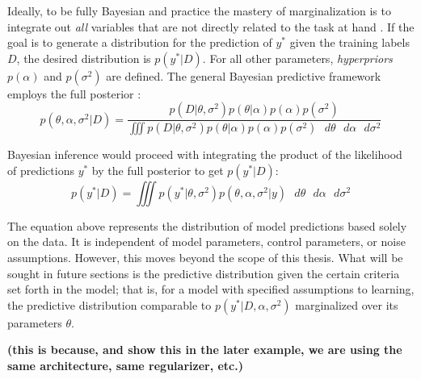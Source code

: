 
Ideally, to be fully Bayesian and practice the mastery of marginalization is to integrate out \textit{all} variables that are not directly related to the task at hand \cite{bishop2006pattern}.  If the goal is to generate a distribution for the prediction of $y^*$ given the training labels $D$, the desired distribution is $p(y^*|D)$.  For all other parameters, \textit{hyperpriors} $p(\alpha)$ and $p(\sigma^2)$ are defined. The general Bayesian predictive framework employs the full posterior \cite{tipping2004bayesian}:
$$
p(\theta,\alpha,\sigma^2|D) = \frac{p(D|\theta,\sigma^2) p(\theta|\alpha)p(\alpha)p(\sigma^2)}
{\iiint p(D|\theta,\sigma^2)p(\theta|\alpha)p(\alpha)p(\sigma^2) \text{ } d\theta \text{ } d\alpha \text{ } d\sigma^2}
$$

Bayesian inference would proceed with integrating the product of the likelihood of predictions $y^*$ by the full posterior to get $p(y^*|D)$:
$$
p(y^*|D) = \iiint p(y^*|\theta,\sigma^2) p(\theta,\alpha,\sigma^2|y)
\text{ } d\theta \text{ } d\alpha \text{ } d\sigma^2
$$

The equation above represents the distribution of model predictions based solely on the data.  It is independent of model parameters, control parameters, or noise assumptions.  However, this moves beyond the scope of this thesis.  What will be sought in future sections is the predictive distribution given the certain criteria set forth in the model; that is, for a model with specified assumptions to learning, the predictive distribution comparable to $p(y^*|D,\alpha,\sigma^2)$ marginalized over its parameters $\theta$.

\textbf{(this is because, and show this in the later example, we are using the same architecture, same regularizer, etc.)}


\begin{comment}
\subsection{Predictive Accuracy Measures}
I feel I need to put Bayes-CV somewhere...

Mention of their frequentist analog (for lppd is is the log-probability score on Rethinking p. 214)

\textbf{Bayesian Cross-Validation} to get the log-pointwise predictive density
$$
lppd_{CV} = \sum_{i=1}^N \frac{1}{S} \sum_{s=1}^S logP(w_i|\theta_{-i,s})
$$

\textbf{Information Criteria} also found in Rethinking (p. 223) and BDA (p. 169)
\end{comment}

